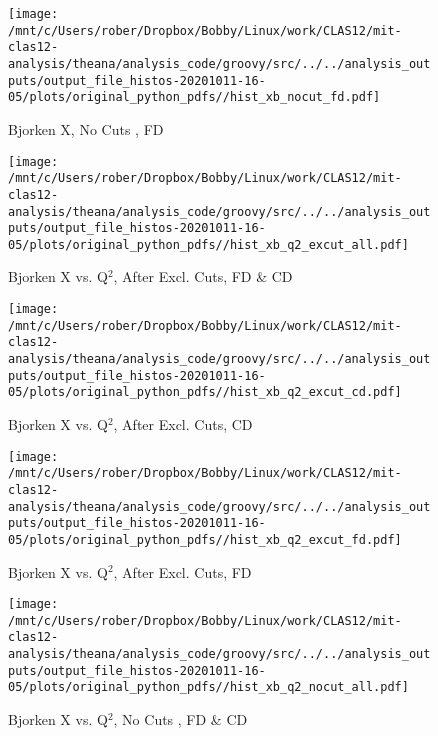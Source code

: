 \documentclass{article}
\begin{document}
\begin{landscape}
    \begin{figure}[h]
        \centering

        \texttt{[image: /mnt/c/Users/rober/Dropbox/Bobby/Linux/work/CLAS12/mit-clas12-analysis/theana/analysis\_code/groovy/src/../../analysis\_outputs/output\_file\_histos-20201011-16-05/plots/original\_python\_pdfs//hist\_xb\_nocut\_fd.pdf]}
        \captionsetup{textformat=empty,labelformat=blank}
        \caption{Bjorken X, No Cuts , FD}
    \end{figure}
    \clearpage
    
    \begin{figure}[h]
        \centering

        \texttt{[image: /mnt/c/Users/rober/Dropbox/Bobby/Linux/work/CLAS12/mit-clas12-analysis/theana/analysis\_code/groovy/src/../../analysis\_outputs/output\_file\_histos-20201011-16-05/plots/original\_python\_pdfs//hist\_xb\_q2\_excut\_all.pdf]}
        \captionsetup{textformat=empty,labelformat=blank}
        \caption{Bjorken X vs. Q$^{2}$, After Excl. Cuts, FD \& CD}
    \end{figure}
    \clearpage
    
    \begin{figure}[h]
        \centering

        \texttt{[image: /mnt/c/Users/rober/Dropbox/Bobby/Linux/work/CLAS12/mit-clas12-analysis/theana/analysis\_code/groovy/src/../../analysis\_outputs/output\_file\_histos-20201011-16-05/plots/original\_python\_pdfs//hist\_xb\_q2\_excut\_cd.pdf]}
        \captionsetup{textformat=empty,labelformat=blank}
        \caption{Bjorken X vs. Q$^{2}$, After Excl. Cuts, CD}
    \end{figure}
    \clearpage
    
    \begin{figure}[h]
        \centering

        \texttt{[image: /mnt/c/Users/rober/Dropbox/Bobby/Linux/work/CLAS12/mit-clas12-analysis/theana/analysis\_code/groovy/src/../../analysis\_outputs/output\_file\_histos-20201011-16-05/plots/original\_python\_pdfs//hist\_xb\_q2\_excut\_fd.pdf]}
        \captionsetup{textformat=empty,labelformat=blank}
        \caption{Bjorken X vs. Q$^{2}$, After Excl. Cuts, FD}
    \end{figure}
    \clearpage
    
    \begin{figure}[h]
        \centering

        \texttt{[image: /mnt/c/Users/rober/Dropbox/Bobby/Linux/work/CLAS12/mit-clas12-analysis/theana/analysis\_code/groovy/src/../../analysis\_outputs/output\_file\_histos-20201011-16-05/plots/original\_python\_pdfs//hist\_xb\_q2\_nocut\_all.pdf]}
        \captionsetup{textformat=empty,labelformat=blank}
        \caption{Bjorken X vs. Q$^{2}$, No Cuts , FD \& CD}
    \end{figure}
    \clearpage
    

\end{landscape}
\end{document}
